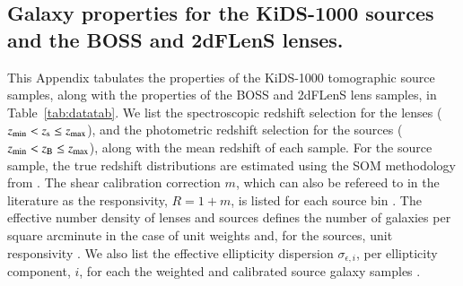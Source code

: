 \begin{appendix} 
\section{Galaxy properties for the KiDS-1000 sources and the BOSS and 2dFLenS lenses.}
\label{app:properties}

This Appendix tabulates the properties of the KiDS-1000 tomographic source samples, along with the properties of the BOSS and 2dFLenS lens samples, in Table~\ref{tab:datatab}.   
We list the spectroscopic redshift selection for the lenses ($z_{\rm min} < z_{\rm s} \leq z_{\rm max}$), and the photometric redshift selection for the sources ($z_{\rm min} < z_{\rm B} \leq z_{\rm max}$), along with the mean redshift of each sample.  
For the source sample, the true redshift distributions are estimated using the SOM methodology from \citet{wright/etal:2020}.     
The shear calibration correction $m$, which can also be refereed to in the literature as the responsivity, $R = 1+m$, is listed for each source bin \citep{kannawadi/etal:2019}.  
The effective number density of lenses and sources defines the number of galaxies per square arcminute in the case of unit weights and, for the sources, unit responsivity \citep[see equations C.11 and C.13 in][]{joachimi/etal:inprep}.  
We also list the  effective ellipticity dispersion $\sigma_{\epsilon,i}$, per ellipticity component, $i$, for each the weighted and calibrated source galaxy samples \citep[equation C.8 in][]{joachimi/etal:inprep}.



\end{appendix}
